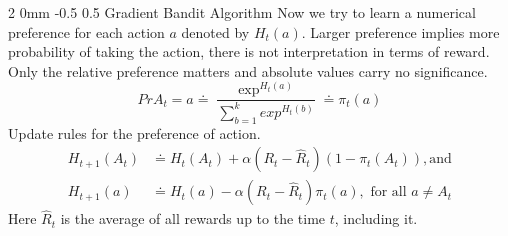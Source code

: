 \documentclass[twocolumn,11pt]{article}
\makeatletter
\renewcommand{\section}{\@startsection
{section}%
{2}%
{0mm}%
{-0.5\baselineskip}%
{0.5\baselineskip}%
{\bfseries\color{blue}}} %
\makeatother
\begin{document}
\section{Gradient Bandit Algorithm}
Now we try to learn a numerical preference for each action $a$ denoted by $H_t(a)$. Larger preference implies more probability of taking the action, there is not interpretation in terms of reward. Only the relative preference matters and absolute values carry no significance. 
\begin{equation}
    Pr{A_t = a} \doteq \dfrac{\exp^{H_t(a)}}{\sum_{b=1 }^{k}exp^{H_t(b)}} \doteq \pi_t(a)
\end{equation}
Update rules for the preference of action.
\begin{equation}
    \begin{split}
        H_{t+1}(A_t) &\doteq H_t (A_t) + \alpha(R_t - \hat{R}_t)(1 - \pi_t(A_t)), \text{and}\\
        H_{t+1}(a) &\doteq H_t(a) - \alpha(R_t - \hat{R}_t)\pi_t(a), \text{ for all $a \neq A_t$}
    \end{split}
\end{equation}
Here $\hat{R}_t$ is the average of all rewards up to the time $t$, including it. 








\end{document}
